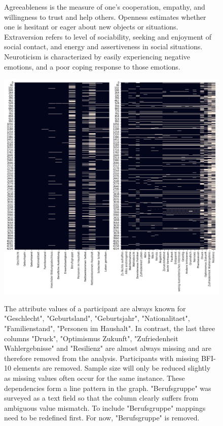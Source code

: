 \begin{appendices}
\begin{figure}[ht]
\begin{center}
\caption{Agreeableness is the measure of one's cooperation, empathy, and willingness to trust and help others. Openness estimates whether one is hesitant or eager about new objects or situations. Extraversion refers to level of sociability, seeking and enjoyment of social contact, and energy and assertiveness in social situations. Neuroticism is characterized by easily experiencing negative emotions, and a poor coping response to those emotions. }
\end{center}
\end{figure}

\begin{figure}[h]
	\begin{center}
		\includegraphics[scale=0.50,angle=0]{fig/gesis_missing}
		\label{std}
		\caption{The attribute values of a participant are always known for "Geschlecht", "Geburtsland", "Geburtsjahr", "Nationalitaet", "Familienstand", "Personen im Haushalt". In contrast, the last three columns "Druck", "Optimismus Zukunft", "Zufriedenheit Wahlergebnisse" and "Resilienz" are almost always missing and are therefore removed from the analysis. Participants with missing BFI-10 elements are removed. Sample size will only be reduced slightly as missing values often occur for the same instance. These dependencies form a line pattern in the graph. "Berufsgruppe" was surveyed as a text field so that the column clearly suffers from ambiguous value mismatch. To include "Berufsgruppe" mappings need to be redefined first. For now, "Berufsgruppe" is removed. }
	\end{center}
\end{figure}


\end{appendices}
